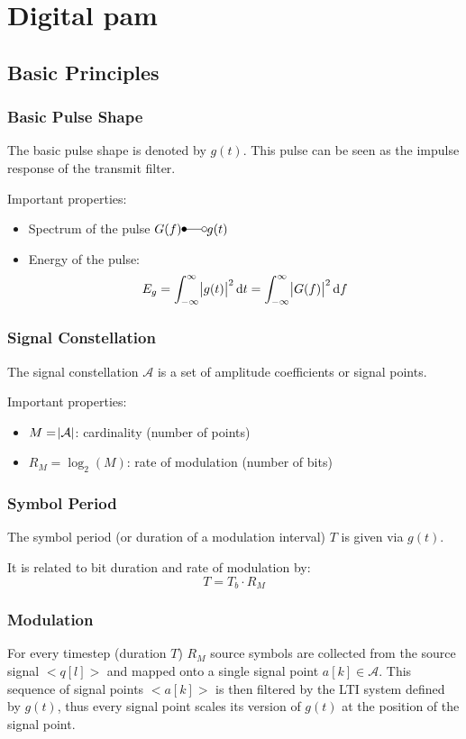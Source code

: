 \chapter{Digital \acl{pam}}
\section{Basic Principles}
\subsection{Basic Pulse Shape}
The basic pulse shape is denoted by $g(t)$. This pulse can be seen as the impulse response
of the transmit filter.

Important properties:
\begin{itemize}
    \item Spectrum of the pulse $G(f) \Laplace g(t)$
    \item Energy of the pulse:
        \begin{equation}
            E_g = \int_{-\infty}^\infty \abs{g(t)}^2 \text{d}t 
                = \int_{-\infty}^\infty \abs{G(f)}^2 \text{d}f
        \end{equation}
\end{itemize}

\subsection{Signal Constellation}
The signal constellation $\mathcal{A}$ is a set of amplitude coefficients or signal points.

Important properties:
\begin{itemize}
    \item $M = \abs{\mathcal{A}}$: cardinality (number of points)
    \item $R_M = \log_2(M)$: rate of modulation (number of bits)
\end{itemize}

\subsection{Symbol Period}
The symbol period (or duration of a modulation interval) $T$ is given via $g(t)$.

It is related to bit duration and rate of modulation by:
\begin{equation}
    T = T_b \cdot R_M
\end{equation}

\subsection{Modulation}
For every timestep (duration $T$) $R_M$ source symbols are collected from the source
signal $<q[l]>$ and mapped onto a single signal point $a[k] \in \mathcal{A}$. This
sequence of signal points $<a[k]>$ is then filtered by the LTI system defined by $g(t)$,
thus every signal point scales its version of $g(t)$ at the position of the signal point.

